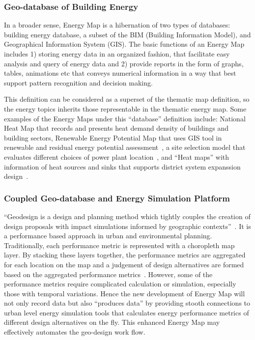 \documentclass[hidelinks,12pt]{article}
\begin{document}
\subsubsection{Geo-database of Building Energy}
In a broader sense, Energy Map is a hibernation of two types of
databases: building energy database, a subset of the BIM (Building
Information Model), and Geographical Information System (GIS). The
basic functions of an Energy Map includes 1) storing energy data in an
organized fashion, that facilitate easy analysis and query of energy
data and 2) provide reports in the form of graphs, tables, animations
etc that conveys numerical information in a way that best support
pattern recognition and decision making. 

This definition can be considered as a superset of the thematic map
definition, so the energy topics inherits those representable in the
thematic energy map. Some examples of the Energy Maps under this
``database'' definition include: National Heat Map that records and
presents heat demand density of buildings and building sectors,
Renewable Energy Potential Map that uses GIS tool in renewable and
residual energy potential assessment~\cite{Voivontas1998333}, a site
selection model that evaluates different choices of power plant
location~\cite{Yeo201499}, and ``Heat maps'' with information of heat
sources and sinks that supports district system expanssion
design~\cite{Finney2012165}.

\subsubsection{Coupled Geo-database and Energy Simulation Platform}
``Geodesign is a design and planning method which tightly couples the
creation of design proposals with impact simulations informed by
geographic contexts''~\cite{Flaxman2010}. It is a performance based
approach in urban and environmental planning. Traditionally, each
performance metric is represented with a choropleth map layer. By
stacking these layers together, the performance metrics are aggregated
for each location on the map and a judgement of design alternatives
are formed based on the aggregated performance
metrics~\cite{CPcp66-goodchild}. However, some of the performance
metrics require complicated calculation or simulation, especially
those with temporal variations. Hence the new development of Energy
Map will not only record data but also ``produces data'' by providing
stooth connections to urban level energy simulation tools that
calculates energy performance metrics of different design alternatives
on the fly. This enhanced Energy Map may effectively automates
the geo-design work flow.
\end{document}
